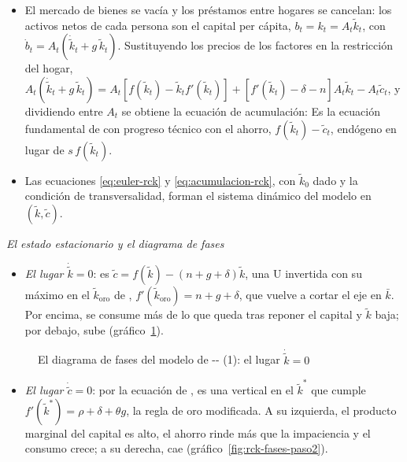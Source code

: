 \documentclass[11pt]{article}
\begin{document}
\begin{itemize}
\item El mercado de bienes se vacía y los préstamos entre hogares se cancelan: los activos netos de cada persona son el capital per cápita, $b_t=k_t=A_t\tilde k_t$, con $\dot b_t=A_t(\dot{\tilde k}_t+g\,\tilde k_t)$. Sustituyendo los precios de los factores en la restricción del hogar, $A_t(\dot{\tilde k}_t+g\,\tilde k_t)=A_t\left[f(\tilde k_t)-\tilde k_tf'(\tilde k_t)\right]+\left[f'(\tilde k_t)-\delta-n\right]A_t\tilde k_t-A_t\tilde c_t$, y dividiendo entre $A_t$ se obtiene la ecuación de acumulación:
  Es la ecuación fundamental de  con progreso técnico con el ahorro, $f(\tilde k_t)-\tilde c_t$, endógeno en lugar de $s\,f(\tilde k_t)$.
\item Las ecuaciones \eqref{eq:euler-rck} y \eqref{eq:acumulacion-rck}, con $\tilde k_0$ dado y la condición de transversalidad, forman el sistema dinámico del modelo en $(\tilde k,\tilde c)$.
\end{itemize}

\hspace*{3.6em}\emph{El estado estacionario y el diagrama de fases}

\begin{itemize}
\item \emph{El lugar $\dot{\tilde k}=0$}: es $\tilde c=f(\tilde k)-(n+g+\delta)\tilde k$, una U invertida con su máximo en el $\tilde k_{\mathrm{oro}}$ de , $f'(\tilde k_{\mathrm{oro}})=n+g+\delta$, que vuelve a cortar el eje en $\bar k$. Por encima, se consume más de lo que queda tras reponer el capital y $\tilde k$ baja; por debajo, sube (gráfico~\ref{fig:rck-fases-paso1}).
\end{itemize}

\begin{figure}[H]
\centering
\caption{El diagrama de fases del modelo de -- (1): el lugar $\dot{\tilde k}=0$}\label{fig:rck-fases-paso1}
\end{figure}

\begin{itemize}
\item \emph{El lugar $\dot{\tilde c}=0$}: por la ecuación de , es una vertical en el $\tilde k^*$ que cumple $f'(\tilde k^*)=\rho+\delta+\theta g$, la regla de oro modificada. A su izquierda, el producto marginal del capital es alto, el ahorro rinde más que la impaciencia y el consumo crece; a su derecha, cae (gráfico~\ref{fig:rck-fases-paso2}).
\end{itemize}
\end{document}
